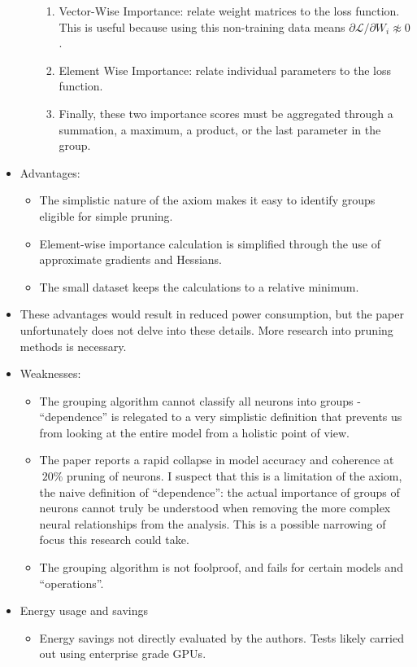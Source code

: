 \documentclass{article}
\begin{document}
\begin{itemize}
\begin{enumerate}
\begin{enumerate}
                \item Vector-Wise Importance: relate weight matrices to the loss function.
                This is useful because using this non-training data means ${\partial \mathcal{L}}/{\partial W_i} \not \approx 0$.
                \item Element Wise Importance: relate individual parameters to the loss function.
                \item Finally, these two importance scores must be aggregated through a summation, a maximum, a product, or the last parameter in the group.
            \end{enumerate}
        \end{enumerate}
        \item Advantages:
        \begin{itemize}
            \item The simplistic nature of the axiom makes it easy to identify groups eligible for simple pruning.
            \item Element-wise importance calculation is simplified through the use of approximate gradients and Hessians.
            \item The small dataset keeps the calculations to a relative minimum.
        \end{itemize}
        \item These advantages would result in reduced power consumption, but the paper unfortunately does not delve into these details.
        More research into pruning methods is necessary.
        \item Weaknesses:
        \begin{itemize}
            \item The grouping algorithm cannot classify all neurons into groups - ``dependence'' is relegated to a very simplistic definition that prevents us from looking at the entire model from a holistic point of view.
            \item The paper reports a rapid collapse in model accuracy and coherence at $~20\%$ pruning of neurons.
            I suspect that this is a limitation of the axiom, the naive definition of ``dependence'':
            the actual importance of groups of neurons cannot truly be understood when removing the more complex neural relationships from the analysis.
            This is a possible narrowing of focus this research could take.
            \item The grouping algorithm is not foolproof, and fails for certain models and ``operations''\cite{LLM-Pruner}.
        \end{itemize}
        \item Energy usage and savings
        \begin{itemize}
            \item Energy savings not directly evaluated by the authors.
            Tests likely carried out using enterprise grade GPUs.
        \end{itemize}
    \end{itemize}
\end{document}
